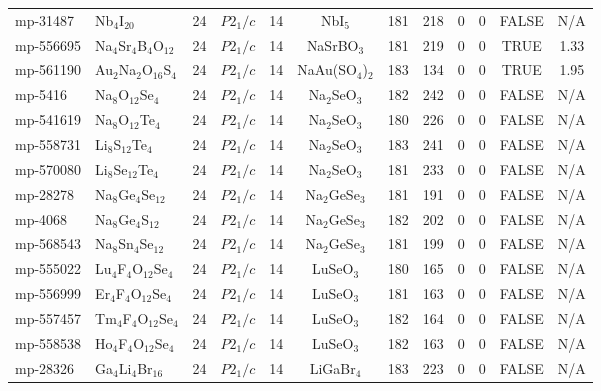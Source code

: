 {\begin{longtable}{llcccccccccc}
    mp-31487 & Nb$_{4}$I$_{20}$ & 24    & $P2_1/c$ & 14    & NbI$_{5}$ & 181   & 218   & 0     & 0     & FALSE & N/A \\
    mp-556695 & Na$_{4}$Sr$_{4}$B$_{4}$O$_{12}$ & 24    & $P2_1/c$ & 14    & NaSrBO$_{3}$ & 181   & 219   & 0     & 0     & TRUE  & 1.33  \\
    mp-561190 & Au$_{2}$Na$_{2}$O$_{16}$S$_{4}$ & 24    & $P2_1/c$ & 14    & NaAu(SO$_{4}$)$_{2}$ & 183   & 134   & 0     & 0     & TRUE  & 1.95  \\
    mp-5416 & Na$_{8}$O$_{12}$Se$_{4}$ & 24    & $P2_1/c$ & 14    & Na$_{2}$SeO$_{3}$ & 182   & 242   & 0     & 0     & FALSE & N/A \\
    mp-541619 & Na$_{8}$O$_{12}$Te$_{4}$ & 24    & $P2_1/c$ & 14    & Na$_{2}$SeO$_{3}$ & 180   & 226   & 0     & 0     & FALSE & N/A \\
    mp-558731 & Li$_{8}$S$_{12}$Te$_{4}$ & 24    & $P2_1/c$ & 14    & Na$_{2}$SeO$_{3}$ & 183   & 241   & 0     & 0     & FALSE & N/A \\
    mp-570080 & Li$_{8}$Se$_{12}$Te$_{4}$ & 24    & $P2_1/c$ & 14    & Na$_{2}$SeO$_{3}$ & 181   & 233   & 0     & 0     & FALSE & N/A \\
    mp-28278 & Na$_{8}$Ge$_{4}$Se$_{12}$ & 24    & $P2_1/c$ & 14    & Na$_{2}$GeSe$_{3}$ & 181   & 191   & 0     & 0     & FALSE & N/A \\
    mp-4068 & Na$_{8}$Ge$_{4}$S$_{12}$ & 24    & $P2_1/c$ & 14    & Na$_{2}$GeSe$_{3}$ & 182   & 202   & 0     & 0     & FALSE & N/A \\
    mp-568543 & Na$_{8}$Sn$_{4}$Se$_{12}$ & 24    & $P2_1/c$ & 14    & Na$_{2}$GeSe$_{3}$ & 181   & 199   & 0     & 0     & FALSE & N/A \\
    mp-555022 & Lu$_{4}$F$_{4}$O$_{12}$Se$_{4}$ & 24    & $P2_1/c$ & 14    & LuSeO$_{3}$ & 180   & 165   & 0     & 0     & FALSE & N/A \\
    mp-556999 & Er$_{4}$F$_{4}$O$_{12}$Se$_{4}$ & 24    & $P2_1/c$ & 14    & LuSeO$_{3}$ & 181   & 163   & 0     & 0     & FALSE & N/A \\
    mp-557457 & Tm$_{4}$F$_{4}$O$_{12}$Se$_{4}$ & 24    & $P2_1/c$ & 14    & LuSeO$_{3}$ & 182   & 164   & 0     & 0     & FALSE & N/A \\
    mp-558538 & Ho$_{4}$F$_{4}$O$_{12}$Se$_{4}$ & 24    & $P2_1/c$ & 14    & LuSeO$_{3}$ & 182   & 163   & 0     & 0     & FALSE & N/A \\
    mp-28326 & Ga$_{4}$Li$_{4}$Br$_{16}$ & 24    & $P2_1/c$ & 14    & LiGaBr$_{4}$ & 183   & 223   & 0     & 0     & FALSE & N/A \\

\end{longtable}}
